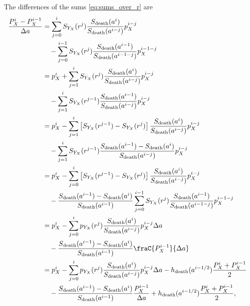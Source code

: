 \documentclass[12pt]{article}
\begin{document}
The differences of the sums \eqref{eq:sums_over_r} are
\begin{equation}
  \label{eq:sums_differences}
  \begin{split}
    \frac{P_X^i - P_X^{i - 1}}{\Delta a}
    &=
    \sum_{j = 0}^i S_{Y_X}(r^j)
    \frac{S_{\text{death}}(a^i)}{S_{\text{death}}(a^{i - j})}
    p_X^{i - j}
    \\ & \quad {}
    - \sum_{j = 0}^{i - 1} S_{Y_X}(r^j)
    \frac{S_{\text{death}}(a^{i - 1})}{S_{\text{death}}(a^{i - 1 - j})}
    p_X^{i - 1 - j}
    \\
    &= p_X^i
    + \sum_{j = 1}^i S_{Y_X}(r^j)
    \frac{S_{\text{death}}(a^i)}{S_{\text{death}}(a^{i - j})}
    p_X^{i - j}
    \\ & \quad {}
    - \sum_{j = 1}^i S_{Y_X}(r^{j - 1})
    \frac{S_{\text{death}}(a^{i - 1})}{S_{\text{death}}(a^{i - j})}
    p_X^{i - j}
    \\
    &= p_X^i
    - \sum_{j = 1}^i
    \left[
      S_{Y_X}(r^{j - 1})
      - S_{Y_X}(r^j)
    \right]
    \frac{S_{\text{death}}(a^i)}{S_{\text{death}}(a^{i - j})}
    p_X^{i - j}
    \\ & \quad {}
    - \sum_{j = 1}^i S_{Y_X}(r^{j - 1})
    \frac{S_{\text{death}}(a^{i - 1}) - S_{\text{death}}(a^i)}
    {S_{\text{death}}(a^{i - j})}
    p_X^{i - j}
    \\
    &= p_X^i
    - \sum_{j = 0}^i
    \left[
      S_{Y_X}(r^{j - 1})
      - S_{Y_X}(r^j)
    \right]
    \frac{S_{\text{death}}(a^i)}{S_{\text{death}}(a^{i - j})}
    p_X^{i - j}
    \\ & \quad {}
    - \frac{S_{\text{death}}(a^{i - 1}) - S_{\text{death}}(a^i)}
    {S_{\text{death}}(a^{i - 1})}
    \sum_{j = 0}^{i - 1} S_{Y_X}(r^j)
    \frac{S_{\text{death}}(a^{i - 1})}{S_{\text{death}}(a^{i - 1 - j})}
    p_X^{i - 1 - j}
    \\
    &= p_X^i
    - \sum_{j = 0}^i p_{Y_X}(r^j)
    \frac{S_{\text{death}}(a^i)}{S_{\text{death}}(a^{i - j})}
    p_X^{i - j} \Delta a
    \\ & \quad {}
    - \frac{S_{\text{death}}(a^{i - 1}) - S_{\text{death}}(a^i)}
    {S_{\text{death}}(a^{i - 1})}
    \fraC{P_X^{i - 1}}{\Delta a}
    \\
    &= p_X^i
    - \sum_{j = 0}^i p_{Y_X}(r^j)
    \frac{S_{\text{death}}(a^i)}{S_{\text{death}}(a^{i - j})}
    p_X^{i - j} \Delta a
    - h_{\text{death}}(a^{i - 1 / 2})
    \frac{P_X^i + P_X^{i - 1}}{2}
    \\ & \quad {}
    - \frac{S_{\text{death}}(a^{i - 1}) - S_{\text{death}}(a^i)}
    {S_{\text{death}}(a^{i - 1})}
    \frac{P_X^{i - 1}}{\Delta a}
    + h_{\text{death}}(a^{i - 1 / 2})
    \frac{P_X^i + P_X^{i - 1}}{2},
  \end{split}
\end{equation}
\end{document}
